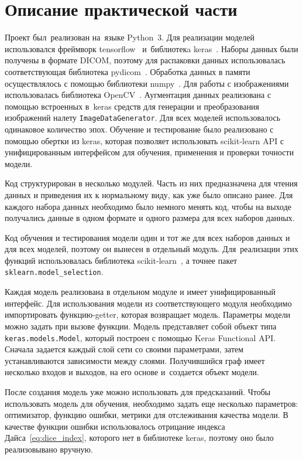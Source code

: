 \section{Описание практической части}

Проект был~реализован на~языке Python~3. Для реализации моделей использовался фреймворк tensorflow~\cite{tensorflow} и~библиотекa keras~\cite{keras}. Наборы данных были получены в формате DICOM, поэтому для распаковки данных использовалась соответствующая библиотека pydicom~\cite{pydicom}. Обработка данных в памяти осуществлялось с помощью библиотеки numpy~\cite{numpy}. Для работы с изображениями использовалась библиотека OpenCV~\cite{opencv}. Аугментация данных реализована с помощью встроенных в~keras средств для генерации и преобразования изображений налету \texttt{ImageDataGenerator}. Для всех моделей использовалось одинаковое количество эпох. Обучение и тестирование было реализовано с помощью обертки из keras, которая позволяет использовать scikit-learn API с унифицированным интерфейсом для обучения, применения и проверки точности модели.

Код структурирован в несколько модулей. Часть из них предназначена для чтения данных и приведения их к нормальному виду, как уже было описано ранее. Для каждого набора данных необходимо было немного менять код, чтобы на выходе получались данные в одном формате и одного размера для всех наборов данных.

Код обучения и тестирования модели один и тот же для всех наборов данных и для всех моделей, поэтому он вынесен в отдельный модуль. Для~реализации этих функций использовалась библиотека scikit-learn~\cite{sklearn}, а точнее пакет \texttt{sklearn.model\_selection}.

Каждая модель реализована в отдельном модуле и имеет унифицированный интерфейс. Для использования модели из соответствующего модуля необходимо импортировать функцию-getter, которая возвращает модель. Параметры модели можно задать при вызове функции. Модель представляет собой объект типа \texttt{keras.models.Model}, который построен с помощью Keras Functional API. Сначала задается каждый слой сети со своими параметрами, затем устанавливаются зависимости между слоями. Получившийся граф имеет несколько входов и выходов, на его основе и~создается объект модели. 

После создания модель уже можно использовать для предсказаний. Чтобы использовать модель для обучения, необходимо задать еще несколько параметров: оптимизатор, функцию ошибки, метрики для отслеживания качества модели. В качестве функции ошибки использовалось отрицание индекса Дайса~\eqref{eq:dice_index}, которого нет в библиотеке keras, поэтому оно было реализовывано вручную.

